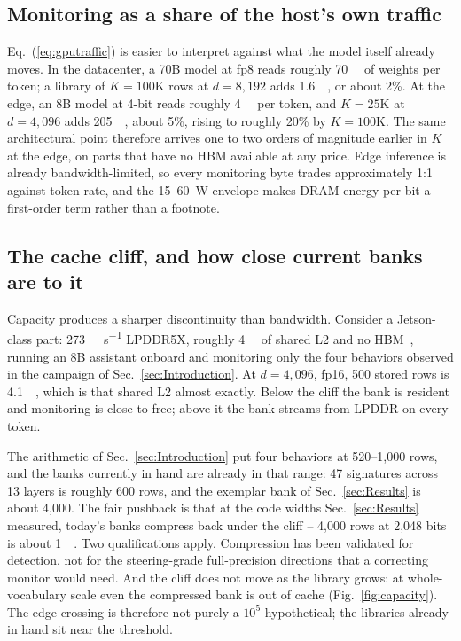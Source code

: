 \documentclass[conference]{IEEEtran}
\begin{document}
\subsection{Monitoring as a share of the host's own traffic}
\label{subsec:Tax}
Eq.~(\ref{eq:gputraffic}) is easier to interpret against what the model
itself already moves. In the datacenter, a 70B model at fp8 reads roughly
\qty{70}{\giga\byte} of weights per token; a library of $K=100$K rows at
$d=8{,}192$ adds \qty{1.6}{\giga\byte}, or about 2\%. At the edge, an 8B
model at 4-bit reads roughly \qty{4}{\giga\byte} per token, and $K=25$K
at $d=4{,}096$ adds \qty{205}{\mega\byte}, about 5\%, rising to roughly
20\% by $K=100$K. The same architectural point therefore arrives one to
two orders of magnitude earlier in $K$ at the edge, on parts that have no
HBM available at any price. Edge inference is already bandwidth-limited,
so every monitoring byte trades approximately 1:1 against token rate, and
the 15--\qty{60}{\watt} envelope makes DRAM energy per bit a first-order
term rather than a footnote.

\subsection{The cache cliff, and how close current banks are to it}
\label{subsec:CacheCliff}
Capacity produces a sharper discontinuity than bandwidth. Consider a
Jetson-class part: \qty{273}{\giga\byte\per\second} LPDDR5X, roughly
\qty{4}{\mega\byte} of shared L2 and no HBM~\cite{nvidia_thor}, running
an 8B assistant onboard and monitoring only the four behaviors observed
in the campaign of Sec.~\ref{sec:Introduction}. At $d=4{,}096$, fp16, 500
stored rows is \qty{4.1}{\mega\byte}, which is that shared L2 almost
exactly. Below the cliff the bank is resident and monitoring is close to
free; above it the bank streams from LPDDR on every token.

The arithmetic of Sec.~\ref{sec:Introduction} put four behaviors at
520--1{,}000 rows, and the banks currently in hand are already in that
range: 47 signatures across 13 layers is roughly 600 rows, and the
exemplar bank of Sec.~\ref{sec:Results} is about 4{,}000. The fair
pushback is that at the code widths Sec.~\ref{sec:Results} measured,
today's banks compress back under the cliff -- 4{,}000 rows at 2{,}048
bits is about \qty{1}{\mega\byte}. Two qualifications apply. Compression has been validated for detection, not for the
steering-grade full-precision directions that a correcting monitor would
need. And the cliff does not move as the library grows: at
whole-vocabulary scale even the compressed bank is out of cache
(Fig.~\ref{fig:capacity}). The edge crossing is therefore not purely a
$10^{5}$ hypothetical; the libraries already in hand sit near the
threshold.
\end{document}
